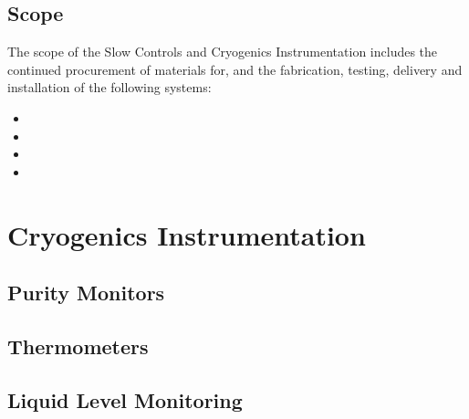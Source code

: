 

\subsection{Scope}
\label{sec:fdsp-slow-cryo-scope}

The scope of the Slow Controls and Cryogenics Instrumentation includes the continued procurement of materials for, and the fabrication, testing, delivery and installation of the following systems: 


\begin{itemize}
\item 
\item 
\item  
\item 
\end{itemize}



\section{Cryogenics Instrumentation}
\label{sec:fdsp-cryo-instr}




\subsection{Purity Monitors}
\label{sec:fdsp-slow-cryo-purity-mon}

\subsection{Thermometers}
\label{sec:fdsp-slow-cryo-therm}

\subsection{Liquid Level Monitoring}
\label{sec:fdsp-slow-cryo-liiq-lev}


